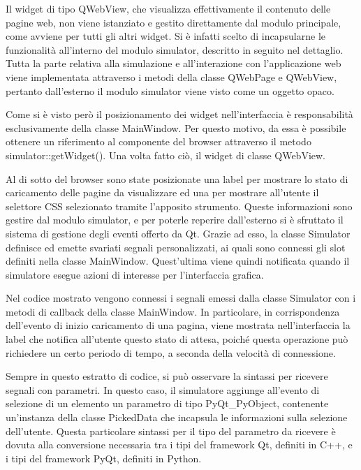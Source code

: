 \documentclass[12pt]{toptesi}
\begin{document}
Il widget di tipo QWebView, che visualizza effettivamente il contenuto delle pagine web, non viene istanziato e gestito direttamente dal modulo principale, come avviene per tutti gli altri widget. Si è infatti scelto di incapsularne le funzionalità all'interno del modulo simulator, descritto in seguito nel dettaglio. Tutta la parte relativa alla simulazione e all'interazione con l'applicazione web viene implementata attraverso i metodi della classe QWebPage e QWebView, pertanto dall'esterno il modulo simulator viene visto come un oggetto opaco. 

Come si è visto però il posizionamento dei widget nell'interfaccia è responsabilità esclusivamente della classe MainWindow. Per questo motivo, da essa è possibile ottenere un riferimento al componente del browser attraverso il metodo simulator::getWidget(). Una volta fatto ciò, il widget di classe QWebView.

Al di sotto del browser sono state posizionate una label per mostrare lo stato di caricamento delle pagine da visualizzare ed una per mostrare all'utente il selettore CSS selezionato tramite l'apposito strumento. Queste informazioni sono gestire dal modulo simulator, e per poterle reperire dall'esterno si è sfruttato il sistema di gestione degli eventi offerto da Qt. Grazie ad esso, la classe Simulator definisce ed emette svariati segnali personalizzati, ai quali sono connessi gli slot definiti nella classe MainWindow. Quest'ultima viene quindi notificata quando il simulatore esegue azioni di interesse per l'interfaccia grafica.



Nel codice mostrato vengono connessi i segnali emessi dalla classe Simulator con i metodi di callback della classe MainWindow. In particolare, in corrispondenza dell'evento di inizio caricamento di una pagina, viene mostrata nell'interfaccia la label che notifica all'utente questo stato di attesa, poiché questa operazione può richiedere un certo periodo di tempo, a seconda della velocità di connessione.  

Sempre in questo estratto di codice, si può osservare la sintassi per ricevere segnali con parametri. In questo caso, il simulatore aggiunge all'evento di selezione di un elemento un parametro di tipo PyQt\_PyObject, contenente un'instanza della classe PickedData che incapsula le informazioni sulla selezione dell'utente. Questa particolare sintassi per il tipo del parametro da ricevere è dovuta alla conversione necessaria tra i tipi del framework Qt, definiti in C++, e i tipi del framework PyQt, definiti in Python. 
\end{document}
